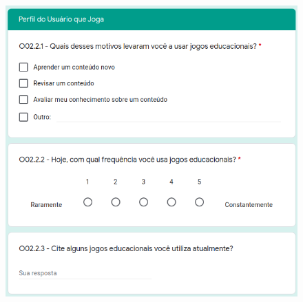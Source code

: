 \begin{apendicesenv}
\begin{figure}[htbp]
{        \includegraphics[keepaspectratio=true,scale=1.25]{figuras/apendice/survey7.png}
        \label{Fig:survey_pt7.png}
    }
    \quad
   

\end{figure}
\end{apendicesenv}
